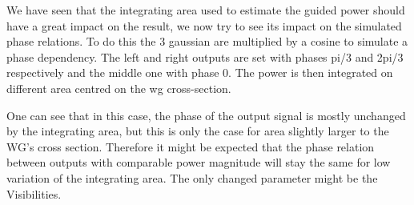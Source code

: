 We have seen that the integrating area used to estimate the guided
power should have a great
impact on the result, we now try to see its impact on the simulated
phase relations. To do this the 3 gaussian are multiplied by a cosine
to simulate a phase dependency. The left and right outputs are set
with phases pi/3 and 2pi/3 respectively and the middle one with phase
0. The power is then integrated on different area centred on the \gls{wg} cross-section.

One can see that in this case, the phase of the output signal is
mostly unchanged by the integrating area, but this is only the case
for area slightly larger to the WG's cross section. Therefore it
might be expected that the phase relation between outputs with
comparable power magnitude will stay the same for low variation of the
integrating area. The only changed parameter might be the Visibilities.

